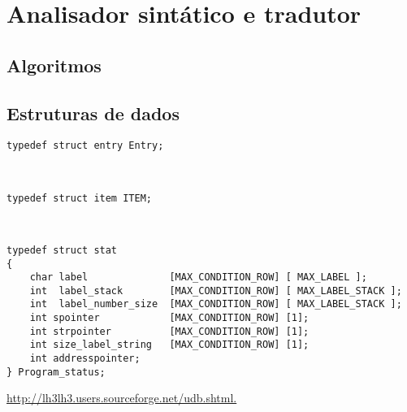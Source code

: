 \section{Analisador sintático e tradutor}
\label{sec:sintatico:desenho}


\subsection{Algoritmos}
\label{sec:subsection:algoritmos:desenho}


\subsection{Estruturas de dados}
\label{sec:subsec:estruturas:desenho}

\begin{verbatim}
typedef struct entry Entry;
\end{verbatim}
\\
\begin{verbatim}
typedef struct item ITEM;
\end{verbatim}
\\
\begin{verbatim}
typedef struct stat
{
    char label              [MAX_CONDITION_ROW] [ MAX_LABEL ];
    int  label_stack        [MAX_CONDITION_ROW] [ MAX_LABEL_STACK ];
    int  label_number_size  [MAX_CONDITION_ROW] [ MAX_LABEL_STACK ];
    int spointer            [MAX_CONDITION_ROW] [1];
    int strpointer          [MAX_CONDITION_ROW] [1];
    int size_label_string   [MAX_CONDITION_ROW] [1];
    int addresspointer;
} Program_status;
\end{verbatim}

\url{http://lh3lh3.users.sourceforge.net/udb.shtml.}
